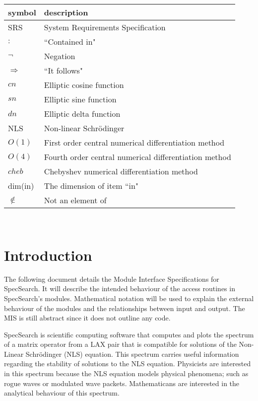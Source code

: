 \documentclass[12pt, titlepage]{article}
\begin{document}
\renewcommand{\arraystretch}{1.2}
\begin{tabular}{l l} 
	\toprule		
	\textbf{symbol} & \textbf{description}\\
	\midrule 
	SRS & System Requirements Specification\\ 
	$:$ & ``Contained in"\\ 
	$\neg$ & Negation\\ 
	$\Rightarrow$ & ``It follows"\\ 
	$cn$ & Elliptic cosine function\\ 
	$sn$ & Elliptic sine function\\ 
	$dn$ & Elliptic delta function \\ 
	NLS & Non-linear Schr\"{o}dinger\\  
	$O(1)$ & First order central numerical differentiation method \\ 
	$O(4)$ & Fourth order central numerical differentiation method \\ 
	$cheb$ & Chebyshev numerical differentiation method\\
	dim(in) & The dimension of item ``in" \\
	$\notin$ & Not an element of\\
	\bottomrule
\end{tabular}\\

\newpage

\tableofcontents

\newpage


\section{Introduction}

The following document details the Module Interface Specifications for
SpecSearch. It will describe the intended behaviour of the 
access routines in SpecSearch's modules. Mathematical notation 
will be used to explain the external 
behaviour 
of the modules and the relationships between input and output. The MIS is still 
abstract since it does not outline any code. 

SpecSearch is scientific computing software that computes and plots 
the spectrum of a matrix operator from a LAX pair that is compatible 
for solutions of the Non-Linear Schr\"{o}dinger (NLS) equation. 
This spectrum carries useful information regarding the stability 
of solutions to the NLS equation. Physicists are interested in this spectrum 
because 
the NLS equation models physical phenomena; such as rogue waves or 
modulated wave packets. Mathematicans are interested in the analytical 
behaviour of this spectrum. 
\end{document}
